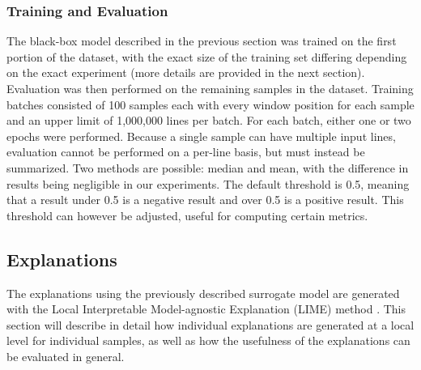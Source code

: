 \documentclass{article}
\begin{document}
			\subsubsection{Training and Evaluation}
			The black-box model described in the previous section was trained on the first portion
			of the dataset, with the exact size of the training set differing depending on the
			exact experiment (more details are provided in the next section). Evaluation was then
			performed on the remaining samples in the dataset. Training batches consisted of 100
			samples each with every window position for each sample and an upper limit of
			1,000,000 lines per batch. For each batch, either one or two epochs were performed.
			Because a single sample can have multiple input lines, evaluation cannot be performed
			on a per-line basis, but must instead be summarized. Two methods are possible: median
			and mean, with the difference in results being negligible in our experiments. The
			default threshold is 0.5, meaning that a result under 0.5 is a negative result and
			over 0.5 is a positive result. This threshold can however be adjusted, useful for
			computing certain metrics.
		\subsection{Explanations}
		The explanations using the previously described surrogate model are generated with the
		Local Interpretable Model-agnostic Explanation (LIME) method \cite{ribeiro_why_2016}. This
		section will describe in detail how individual explanations are generated at a local level
		for individual samples, as well as how the usefulness of the explanations can be evaluated
		in general.
\end{document}

